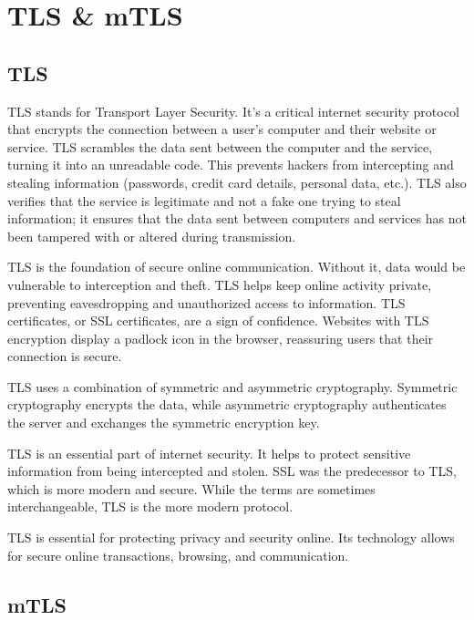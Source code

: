 %
%

\pagebreak
\section{TLS \& mTLS}

\onehalfspacing

\subsection{TLS}

TLS stands for Transport Layer Security. It's a critical internet
security protocol that encrypts the connection between a user's computer
and their website or service. TLS scrambles the data sent between the
computer and the service, turning it into an unreadable code. This
prevents hackers from intercepting and stealing information (passwords,
credit card details, personal data, etc.). TLS also verifies that the
service is legitimate and not a fake one trying to steal information; it
ensures that the data sent between computers and services has not been
tampered with or altered during transmission.

TLS is the foundation of secure online communication. Without it, data
would be vulnerable to interception and theft. TLS helps keep online
activity private, preventing eavesdropping and unauthorized access to
information. TLS certificates, or SSL certificates, are a sign of
confidence. Websites with TLS encryption display a padlock icon in the
browser, reassuring users that their connection is secure.

TLS uses a combination of symmetric and asymmetric
cryptography. Symmetric cryptography encrypts the data, while
asymmetric cryptography authenticates the server and exchanges the
symmetric encryption key.

TLS is an essential part of internet security. It helps to
protect sensitive information from being intercepted and stolen. SSL was
the predecessor to TLS, which is more modern and secure. While the terms
are sometimes interchangeable, TLS is the more modern protocol.

TLS is essential for protecting privacy and security online. Its
technology allows for secure online transactions, browsing, and
communication.

\subsection{mTLS}


